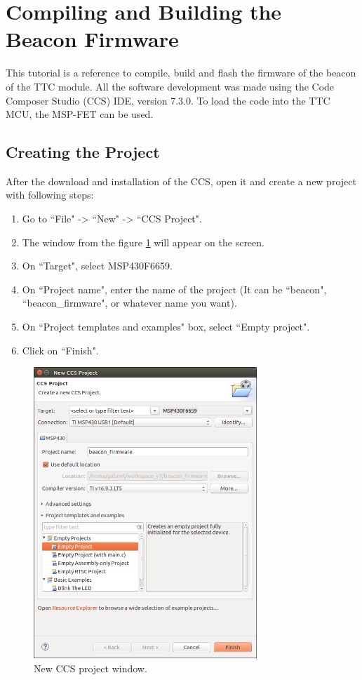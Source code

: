 \section{Compiling and Building the Beacon Firmware}

This tutorial is a reference to compile, build and flash the firmware of the beacon of the TTC module. All the software development was made using the Code Composer Studio (CCS) IDE, version 7.3.0. To load the code into the TTC MCU, the MSP-FET can be used.

\subsection{Creating the Project}

After the download and installation of the CCS, open it and create a new project with following steps:

\begin{enumerate}
    \item Go to ``File" -> ``New" -> ``CCS Project".
    \item The window from the figure \ref{fig:compiling-tutorial} will appear on the screen.
    \item On ``Target", select MSP430F6659.
    \item On ``Project name", enter the name of the project (It can be ``beacon", ``beacon\_firmware", or whatever name you want).
    \item On ``Project templates and examples" box, select ``Empty project".
    \item Click on ``Finish".
\end{enumerate}

\begin{figure}[!h]
	\begin{center}
		\includegraphics[width=0.75\textwidth]{figures/ccs_project.png}
		\caption{New CCS project window.}
		\label{fig:compiling-tutorial}
	\end{center}
\end{figure}


